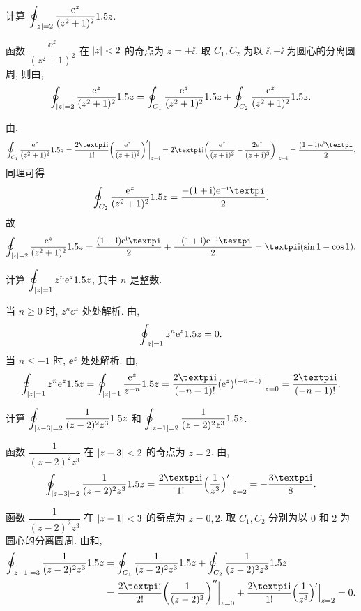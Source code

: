 \begin{example}
  计算 $\displaystyle\oint_{\lvert z\rvert=2}\frac{\mathrm{e}^z}{(z^2+1)^2}1.5 z$.
\end{example}

\begin{solution}
  函数 $\dfrac{\ee^z}{(z^2+1)^2}$ 在 $\lvert z\rvert<2$ 的奇点为 $z=\pm\ii $.
  取 $C_1,C_2$ 为以 $\ii,-\ii $ 为圆心的分离圆周, 则由\thmCCC,
  \[
     \oint_{\lvert z\rvert=2}\frac{\mathrm{e}^z}{(z^2+1)^2}1.5 z
    =\oint_{C_1}\frac{\mathrm{e}^z}{(z^2+1)^2}1.5 z
    +\oint_{C_2}\frac{\mathrm{e}^z}{(z^2+1)^2}1.5 z.
  \]

  由\thmCIH,
  \[
     \oint_{C_1}\frac{\ee^z}{(z^2+1)^2}\d z
    =\frac{2\cpi\ii}{1!}\biggl(\frac{\ee^z}{(z+\ii)^2}\biggr)'\bigg|_{z=\ii}
    =2\cpi\ii \biggl(\frac{\ee^z}{(z+\ii)^2}-\frac{2\ee^z}{(z+\ii)^3}\biggr)\bigg|_{z=\ii}
    =\frac{(1-\ii)\ee^\ii \cpi}2,
  \]
  同理可得
  \[
     \oint_{C_2}\frac{\ee^z}{(z^2+1)^2}\d z
    =\frac{-(1+\ii)\ee^{-\ii }\cpi}2.
  \]
  故
  \[
     \oint_{\abs{z}=2}\frac{\ee^z}{(z^2+1)^2}\d z
    =\frac{(1-\ii)\ee^\ii \cpi}2+\frac{-(1+\ii)\ee^{-\ii }\cpi}2
    =\cpi\ii (\sin1-\cos1).
  \]
\end{solution}

\begin{example}
  计算 $\displaystyle\oint_{\lvert z\rvert=1}z^n\mathrm{e}^z1.5 z$, 其中 $n$ 是整数.
\end{example}

\begin{solution}
  当 $n\ge 0$ 时, $z^n\ee^z$ 处处解析.
  由\thmCG, 
  \[
    \oint_{\lvert z\rvert=1}z^n\mathrm{e}^z1.5 z=0.
  \]
  当 $n\le-1$ 时, $\ee^z$ 处处解析.
  由\thmCIH,
  \[
     \oint_{\abs{z}=1}z^n\ee^z\d z
    =\oint_{\abs{z}=1}\frac{\ee^z}{z^{-n}}\d z
    =\frac{2\cpi\ii}{(-n-1)!}(\ee^z)^{(-n-1)}\big|_{z=0}
    =\frac{2\cpi\ii}{(-n-1)!}.
  \]
\end{solution}

\begin{example}
  计算 $\displaystyle\oint_{\lvert z-3\rvert=2}\frac1{(z-2)^2z^3}1.5 z$ 和 $\displaystyle\oint_{\lvert z-1\rvert=2}\frac1{(z-2)^2z^3}1.5 z$.
\end{example}

\begin{solutionenum}
  \item 函数 $\dfrac1{(z-2)^2z^3}$ 在 $\lvert z-3\rvert<2$ 的奇点为 $z=2$.
  由\thmCIH,
  \[
      \oint_{\abs{z-3}=2}\frac1{(z-2)^2z^3}\d z
    =\frac{2\cpi\ii}{1!}\Bigl(\frac1{z^3}\Bigr)'\Big|_{z=2}
    =-\frac{3\cpi\ii }8.
  \]
  \item \label{enum:exam-contain-all-singular}
  函数 $\dfrac1{(z-2)^2z^3}$ 在 $\lvert z-1\rvert<3$ 的奇点为 $z=0,2$.
  取 $C_1,C_2$ 分别为以 $0$ 和 $2$ 为圆心的分离圆周.
  由\thmCCC 和\thmCI,
  \begin{align*}
      \oint_{\abs{z-1}=3}\frac1{(z-2)^2z^3}\d z
    &=\oint_{C_1}\frac1{(z-2)^2z^3}\d z+\oint_{C_2}\frac1{(z-2)^2z^3}\d z\\
    &=\frac{2\cpi\ii}{2!}\biggl(\frac1{(z-2)^2}\biggr)''\bigg|_{z=0}+\frac{2\cpi\ii}{1!}\Bigl(\frac1{z^3}\Bigr)'\Big|_{z=2}=0.
  \end{align*}
\end{solutionenum}

